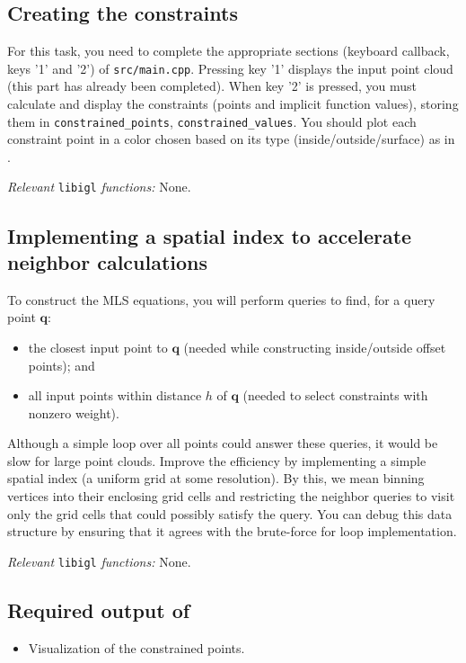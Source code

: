 \documentclass[11pt]{amsart}
\newcommand\pr[1]{\prettyref{#1}}
\renewcommand{\vec}[1]{\mathbf{#1}}
\begin{document}
\subsection{Creating the constraints}
For this task, you need to complete the appropriate sections (keyboard callback,
keys '1' and '2') of \texttt{src/main.cpp}. Pressing key '1' displays the
input point cloud (this part has already been completed).
When key '2' is pressed, you must calculate and display the constraints
(points and implicit function values), storing them in
\texttt{constrained\_points},
\texttt{constrained\_values}. You should plot each constraint point in a color
chosen based on its type (inside/outside/surface) as in \pr{fig:cat_ptcloud}.

\emph{Relevant} \texttt{libigl} \emph{functions: } None.

\subsection{Implementing a spatial index to accelerate neighbor
calculations} To construct the MLS equations, you will perform queries
to find, for a query point $\vec q$:
\begin{itemize}
    \item the closest input point to $\vec q$ (needed while constructing
        inside/outside offset points); and
    \item all input points within distance $h$ of $\vec q$ (needed to
        select constraints with nonzero weight).
\end{itemize}
Although a simple loop over all points could answer these queries, it would be
slow for large point clouds. Improve the efficiency by implementing a simple
spatial index (a uniform grid at some resolution). By this, we mean binning
vertices into their enclosing grid cells and restricting the neighbor queries to
visit only the grid cells that could possibly satisfy the query. You can debug
this data structure by ensuring that it agrees with the brute-force for
loop implementation.

\emph{Relevant} \texttt{libigl} \emph{functions: } None.

\subsection*{Required output of \pr{sec:constraints}}
\begin{itemize}
\item{Visualization of the constrained points.}
\end{itemize}
\end{document}

